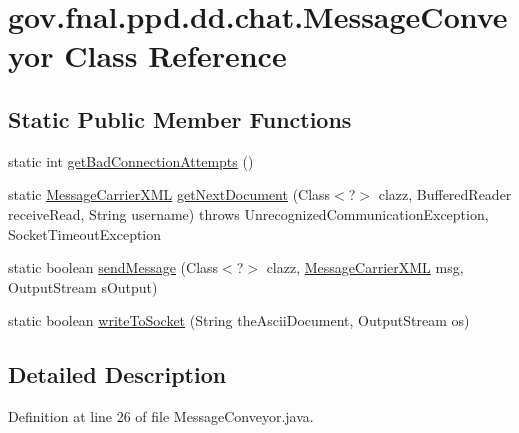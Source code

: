 \hypertarget{classgov_1_1fnal_1_1ppd_1_1dd_1_1chat_1_1MessageConveyor}{\section{gov.\-fnal.\-ppd.\-dd.\-chat.\-Message\-Conveyor Class Reference}
\label{classgov_1_1fnal_1_1ppd_1_1dd_1_1chat_1_1MessageConveyor}
}
\subsection*{Static Public Member Functions}
\begin{DoxyCompactItemize}
\item 
static int \hyperlink{classgov_1_1fnal_1_1ppd_1_1dd_1_1chat_1_1MessageConveyor_aebb7c15f246ede2ca14fc803978c7b7e}{get\-Bad\-Connection\-Attempts} ()
\item 
static \hyperlink{classgov_1_1fnal_1_1ppd_1_1dd_1_1xml_1_1MessageCarrierXML}{Message\-Carrier\-X\-M\-L} \hyperlink{classgov_1_1fnal_1_1ppd_1_1dd_1_1chat_1_1MessageConveyor_ae56d91de80414057b1d55c555a188194}{get\-Next\-Document} (Class$<$?$>$ clazz, Buffered\-Reader receive\-Read, String username)  throws Unrecognized\-Communication\-Exception, Socket\-Timeout\-Exception 
\item 
static boolean \hyperlink{classgov_1_1fnal_1_1ppd_1_1dd_1_1chat_1_1MessageConveyor_ad75f4183546edf67ecc120cd4a763f5b}{send\-Message} (Class$<$?$>$ clazz, \hyperlink{classgov_1_1fnal_1_1ppd_1_1dd_1_1xml_1_1MessageCarrierXML}{Message\-Carrier\-X\-M\-L} msg, Output\-Stream s\-Output)
\item 
static boolean \hyperlink{classgov_1_1fnal_1_1ppd_1_1dd_1_1chat_1_1MessageConveyor_a3f948d3a9e2544f6ccd6fa371d1db792}{write\-To\-Socket} (String the\-Ascii\-Document, Output\-Stream os)
\end{DoxyCompactItemize}


\subsection{Detailed Description}


Definition at line 26 of file Message\-Conveyor.\-java.



